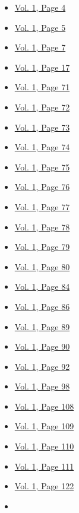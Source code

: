 \begin{itemize}
  \begin{itemize}
  \tightlist
  \item
    \protect\hyperlink{g-page-12}{Vol. 1, Page 4}
  \item
    \protect\hyperlink{g-page-13}{Vol. 1, Page 5}
  \item
    \protect\hyperlink{g-page-15}{Vol. 1, Page 7}
  \item
    \protect\hyperlink{g-page-25}{Vol. 1, Page 17}
  \item
    \protect\hyperlink{g-page-79}{Vol. 1, Page 71}
  \item
    \protect\hyperlink{g-page-80}{Vol. 1, Page 72}
  \item
    \protect\hyperlink{g-page-81}{Vol. 1, Page 73}
  \item
    \protect\hyperlink{g-page-82}{Vol. 1, Page 74}
  \item
    \protect\hyperlink{g-page-83}{Vol. 1, Page 75}
  \item
    \protect\hyperlink{g-page-84}{Vol. 1, Page 76}
  \item
    \protect\hyperlink{g-page-85}{Vol. 1, Page 77}
  \item
    \protect\hyperlink{g-page-86}{Vol. 1, Page 78}
  \item
    \protect\hyperlink{g-page-87}{Vol. 1, Page 79}
  \item
    \protect\hyperlink{g-page-88}{Vol. 1, Page 80}
  \item
    \protect\hyperlink{g-page-92}{Vol. 1, Page 84}
  \item
    \protect\hyperlink{g-page-94}{Vol. 1, Page 86}
  \item
    \protect\hyperlink{g-page-97}{Vol. 1, Page 89}
  \item
    \protect\hyperlink{g-page-98}{Vol. 1, Page 90}
  \item
    \protect\hyperlink{g-page-100}{Vol. 1, Page 92}
  \item
    \protect\hyperlink{g-page-106}{Vol. 1, Page 98}
  \item
    \protect\hyperlink{g-page-116}{Vol. 1, Page 108}
  \item
    \protect\hyperlink{g-page-117}{Vol. 1, Page 109}
  \item
    \protect\hyperlink{g-page-118}{Vol. 1, Page 110}
  \item
    \protect\hyperlink{g-page-119}{Vol. 1, Page 111}
  \item
    \protect\hyperlink{g-page-130}{Vol. 1, Page 122}
  \item

\end{itemize}
\end{itemize}
